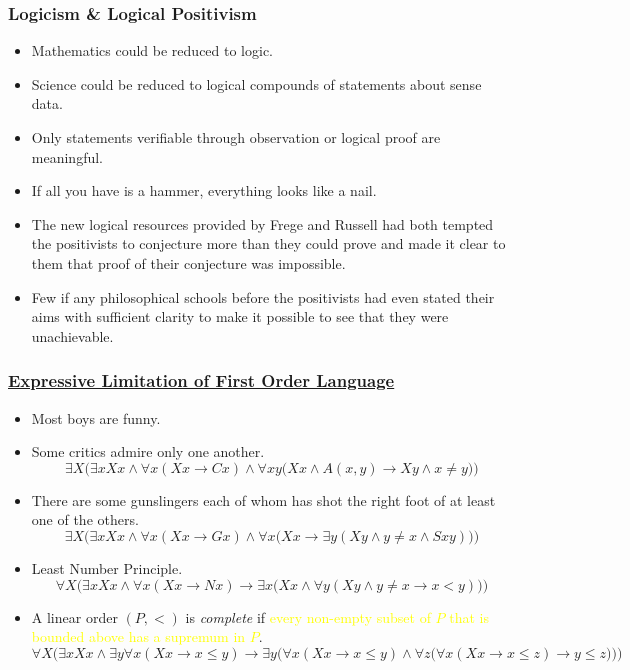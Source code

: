 \documentclass[UTF8,aspectratio=43,11pt,colorlinks,compress,openany]{beamer}%
\begin{document}
\begin{frame}\frametitle{Logicism \& Logical Positivism}
\begin{itemize}
	\item Mathematics could be reduced to logic.
	\item Science could be reduced to logical compounds of statements about sense data.
	\item Only statements verifiable through observation or logical proof are meaningful.
	\item If all you have is a hammer, everything looks like a nail.
	\item The new logical resources provided by Frege and Russell had both tempted the positivists to conjecture more than they could prove and made it clear to them that proof of their conjecture was impossible.
	\item Few if any philosophical schools before the positivists had even stated their aims with sufficient clarity to make it possible to see that they were unachievable.
\end{itemize}
\end{frame}

\begin{frame}\frametitle{\href{https://www.pdcnet.org/jphil/content/jphil_1984_0081_0008_0430_0449}{Expressive Limitation of First Order Language}}
\begin{itemize}
	\item Most boys are funny.
	\item Some critics admire only one another.
\[\exists X\Big(\exists x Xx\wedge \forall x(Xx\to Cx)\wedge \forall xy\big(Xx\wedge A(x,y)\to Xy\wedge x\ne y\big)\Big)\]
	\item There are some gunslingers each of whom has shot the right foot of at least one of the others.
\[\exists X\Big(\exists xXx\wedge \forall x(Xx\to Gx)\wedge\forall x\big(Xx\to\exists y(Xy\wedge y\ne x\wedge Sxy)\big)\Big)\]
	\item Least Number Principle.
\[\forall X\Big(\exists xXx\wedge \forall x(Xx\to Nx)\to\exists x\big(Xx\wedge\forall y(Xy\wedge y\ne x\to x<y)\big)\Big)\]
	\item A linear order $(P,<)$ is \emph{complete} if \textcolor{yellow}{every non-empty subset of $P$ that is bounded above has a supremum in $P$}.\\
$\forall X\bigg(\exists x Xx\wedge\exists y\forall x(Xx\to x\leq y)\to\exists y\Big(\forall x(Xx\to x\leq y)\wedge\forall z\big(\forall x(Xx\to x\leq z)\to y\leq z\big)\Big)\bigg)$
\end{itemize}
\end{frame}
\end{document}
